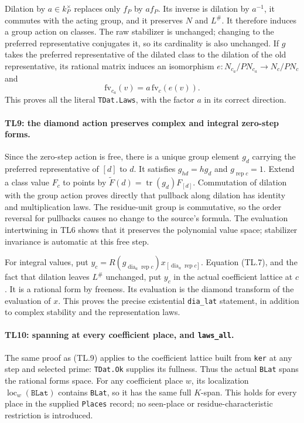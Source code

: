 \documentclass[11pt,a4paper]{article}
\numberwithin{equation}{section}
\theoremstyle{remark}\newtheorem{remark}[theorem]{Remark}
\begin{document}
Dilation by $a\in k_P^\times$ replaces only $f_P$ by $af_P$.
Its inverse is dilation by $a^{-1}$, it commutes with the acting
group, and it preserves $N$ and $L^\#$. It therefore induces a
group action on classes. The raw stabilizer is unchanged; changing
to the preferred representative conjugates it, so its cardinality
is also unchanged. If $g$ takes the preferred representative of the
dilated class to the dilation of the old representative, its
rational matrix induces an isomorphism
$e:N_{c_a}/PN_{c_a}\to N_c/PN_c$ and
\[
 \mathrm{fv}_{c_a}(v)=a\,\mathrm{fv}_c(e(v)).      \tag{TL.13}
\]
This proves all the literal \texttt{TDat.Laws}, with the factor
$a$ in its correct direction.

\paragraph{TL9: the diamond action preserves complex and integral
zero-step forms.}
Since the zero-step action is free, there is a unique group element
$g_d$ carrying the preferred representative of $[d]$ to $d$.
It satisfies $g_{hd}=hg_d$ and $g_{\operatorname{rep}c}=1$.
Extend a class value $F_c$ to points by
$\widetilde F(d)=\operatorname{tr}(g_d)F_{[d]}$.
Commutation of dilation with the group action proves directly that
pullback along dilation has identity and multiplication laws. The
residue-unit group is commutative, so the order reversal for
pullbacks causes no change to the source's formula. The evaluation
intertwining in TL6 shows that it preserves the polynomial value
space; stabilizer invariance is automatic at this free step.

For integral values, put
$y_c=R(g_{\operatorname{dia}_a\operatorname{rep}c})
 x_{[\operatorname{dia}_a\operatorname{rep}c]}$.
Equation (TL.7), and the fact that dilation leaves $L^\#$ unchanged,
put $y_c$ in the actual coefficient lattice at $c$. It is a rational
form by freeness. Its evaluation is the diamond transform of the
evaluation of $x$. This proves the precise existential
\texttt{dia\_\allowbreak lat} statement, in addition to complex stability and
the representation laws.

\paragraph{TL10: spanning at every coefficient place, and
\texttt{laws\_\allowbreak all}.}
The same proof as (TL.9) applies to the coefficient lattice built
from \texttt{ker} at any step and selected prime: \texttt{TDat.Ok}
supplies its fullness. Thus the actual \texttt{BLat} spans the
rational forms space. For any coefficient place $w$, its localization
$\operatorname{loc}_w(\texttt{BLat})$ contains \texttt{BLat}, so it
has the same full $K$-span. This holds for every place in the supplied
\texttt{Places} record; no seen-place or residue-characteristic
restriction is introduced.
\end{document}
